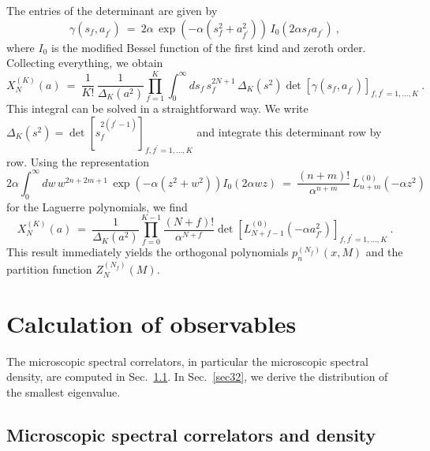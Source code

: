 The entries of the determinant are given by
\begin{equation}
\gamma(s_f,a_{f^\prime}) \ = \ 2\alpha \, 
         \exp\left(-\alpha(s_f^2+a_{f^\prime}^2)\right) \,
                        I_0(2\alpha s_f a_{f^\prime}) \ ,
\label{diffkern}
\end{equation}
where $I_0$ is the modified Bessel function of the first kind and
zeroth order.  Collecting everything, we obtain
\begin{equation}
X_N^{(K)}(a) \ = \ \frac{1}{K!} \, \frac{1}{\Delta_K(a^2)} 
       \prod_{f=1}^K \int_0^\infty ds_f \, s_f^{2N+1} \, \Delta_K(s^2)
  \det\left[\gamma(s_f,a_{f^\prime})\right]_{f,f^\prime=1,\ldots,K}\:.
\label{integral}
\end{equation}
This integral can be solved in a straightforward way. We write
$\Delta_K(s^2)=\det[s_f^{2(f^\prime-1)}]_{f,f^\prime=1,\ldots,K}$
and integrate this determinant row by row. Using the representation
\begin{equation}
2\alpha \int_0^\infty dw \, w^{2n+2m+1} \,
       \exp\left(-\alpha(z^2+w^2)\right) I_0(2\alpha wz) \ = \
\frac{(n+m)!}{\alpha^{n+m}} \, L_{n+m}^{(0)}(-\alpha z^2)
\label{intrepres}
\end{equation}
for the Laguerre polynomials, we find 
\begin{equation}
X_N^{(K)}(a) \ = \ \frac{1}{\Delta_K(a^2)} 
 \prod_{f=0}^{K-1} \frac{(N+f)!}{\alpha^{N+f}}
 \det\left[L_{N+f-1}^{(0)}(-\alpha
 a_{f'}^2)\right]_{f,f^\prime=1,\ldots,K} \ .
\label{chefformel}
\end{equation}
This result immediately yields the orthogonal polynomials
$p_n^{(N_f)}(x,M)$ and the partition function $Z_N^{(N_f)}(M)$.


\section{Calculation of observables}
\label{sec3}

The microscopic spectral correlators, in particular the microscopic
spectral density, are computed in Sec.~\ref{sec31}. In
Sec.~\ref{sec32}, we derive the distribution of the smallest
eigenvalue.

\subsection{Microscopic spectral correlators and density}
\label{sec31}

